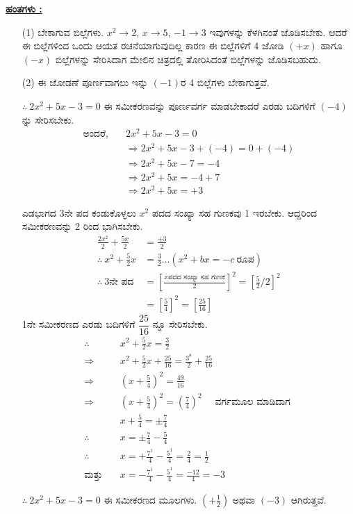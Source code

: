 \noindent
{\textbf{\underline{ಹಂತಗಳು :}}}
\begin{itemize}
\item [(1)] ಬೇಕಾಗುವ ಬಿಲ್ಲೆಗಳು. $x^2 \rightarrow 2$, $x \rightarrow 5$, $-1 \rightarrow 3$ ಇವುಗಳನ್ನು ಕೆಳಗಿನಂತೆ ಜೊಡಿಸಬೇಕು. ಆದರೆ ಈ ಬಿಲ್ಲೆಗಳಿಂದ ಒಂದು ಆಯತ ರಚನೆಯಾಗುವುದಿಲ್ಲ ಕಾರಣ ಈ ಬಿಲ್ಲೆಗಳಿಗೆ 4 ಜೋಡಿ $(+x)$ ಹಾಗೂ $(-x)$ ಬಿಲ್ಲೆಗಳನ್ನು ಸೇರಿಸಿದಾಗ ಮೇಲಿನ ಚಿತ್ರದಲ್ಲಿ ತೋರಿಸಿದಂತೆ ಬಿಲ್ಲೆಗಳನ್ನು ಜೊಡಿಸಬಹುದು.
\item [(2)] ಈ ಜೋಡಣೆ ಪೂರ್ಣವಾಗಲು ಇನ್ನು $(-1)$ರ 4 ಬಿಲ್ಲೆಗಳು ಬೇಕಾಗುತ್ತವೆ. 

$\therefore~ 2x^2 + 5x - 3 = 0$ ಈ ಸಮೀಕರಣವನ್ನು ಪೂರ್ಣವರ್ಗ ಮಾಡಬೇಕಾದರೆ ಎರಡು ಬದಿಗಳಿಗೆ $(-4)$ನ್ನು ಸೇರಿಸಬೇಕು.
\begin{align*}
\text{ಅಂದರೆ},\quad & 2x^2 + 5x - 3 = 0\\
& \Rightarrow 2x^2 + 5x - 3 + (-4) = 0 + (-4)\\
& \Rightarrow 2x^2 + 5x - 7 = -4\\
& \Rightarrow 2x^2 + 5x = -4 + 7\\
& \Rightarrow 2x^2 + 5x = +3
\end{align*}

ಎಡಭಾಗದ 3ನೇ ಪದ ಕಂಡುಕೊಳ್ಳಲು $x^2$ ಪದದ ಸಂಖ್ಯಾ ಸಹ ಗುಣಕವು 1 ಇರಬೇಕು. ಆದ್ದರಿಂದ ಸಮೀಕರಣವನ್ನು 2 ರಿಂದ ಭಾಗಿಸಬೇಕು.
\begin{align*}
\frac{2x^2}{2} + \frac{5x}{2} & = \frac{+3}{2}\\
\therefore~ x^2 + \frac{5}{2}x & = \frac{3}{2} \hdots (x^2 + bx = -c ~\text{ರೂಪ}) \tag{1}\\
\therefore~ 3\text{ನೇ ಪದ} & = \left[\frac{x \text{ಪದದ ಸಂಖ್ಯಾ ಸಹ ಗುಣಕ}}{2} \right]^2  = \left[\frac{5}{2}/2 \right]^2 \\
& = \left[\frac{5}{4}\right]^2 = \left[\frac{25}{16} \right]
\end{align*} 
1ನೇ ಸಮೀಕರಣದ ಎರಡು ಬದಿಗಳಿಗೆ $\dfrac{25}{16}$ ನ್ನೂ ಸೇರಿಸಬೇಕು.
\begin{align*}
\therefore & \quad  x^2 + \frac{5}{2}x = \frac{3}{2}\\
 \Rightarrow & \quad  x^2 + \frac{5}{2}x + \frac{25}{16} = \frac{3^8}{2} + \frac{25}{16}\\
 \Rightarrow &\quad  \left(x + \frac{5}{4} \right)^2 = \frac{49}{16}\\
 \Rightarrow & \quad \left(x + \frac{5}{4} \right)^2 = \left(\frac{7}{4} \right)^2 \quad \text{ ವರ್ಗಮೂಲ ಮಾಡಿದಾಗ }\\
& \quad x + \frac{5}{4} = \pm \frac{7}{4}\\
\therefore & \quad   x = \pm \frac{7}{4} - \frac{5}{4}\\
\therefore  & \quad x = +\frac{7^1}{4} - \frac{5^1}{4} = \frac{2}{4} = \frac{1}{2}\\
 \text{ಮತ್ತು} & \quad  x = -\frac{7^1}{4} - \frac{5^1}{4} = \frac{-12}{4} = -3 
\end{align*}

$\therefore~ 2x^2 + 5x - 3 = 0$ ಈ ಸಮೀಕರಣದ ಮೂಲಗಳು. $\left(+\frac{1}{2} \right)$ ಅಥವಾ $(-3)$ ಆಗಿರುತ್ತವೆ.
\end{itemize}

